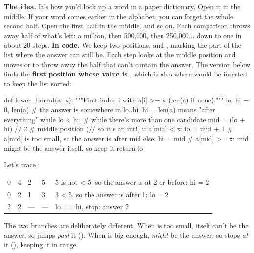 \documentclass[10pt,a4paper]{article}
\begin{document}
\textbf{The idea.} It’s how you’d look up a word in a paper dictionary. Open it in the middle. If your word comes earlier in the alphabet, you can forget the whole second half. Open the first half in the middle, and so on. Each comparison throws away half of what’s left: a million, then 500,000, then 250,000... down to one in about 20 steps.
\textbf{In code.} We keep two positions,  and , marking the part of the list where the answer can still be. Each step looks at the middle position  and moves  or  to throw away the half that can’t contain the answer. The version below finds the \textbf{first position whose value is }, which is also where  would be inserted to keep the list sorted:
\begin{pycode}
def lower_bound(a, x):
    """First index i with a[i] >= x (len(a) if none)."""
    lo, hi = 0, len(a)            # the answer is somewhere in lo..hi; hi = len(a) means "after everything"
    while lo < hi:                # while there's more than one candidate
        mid = (lo + hi) // 2      # middle position (// so it's an int!)
        if a[mid] < x:
            lo = mid + 1          # a[mid] is too small, so the answer is after mid
        else:
            hi = mid              # a[mid] >= x: mid might be the answer itself, so keep it
    return lo
\end{pycode}
Let’s trace :
\begin{datatable}{}{\small}
\begin{xltabular}{\linewidth}{@{}Y{0.43}Y{0.43}Y{0.43}Y{0.43}Y{3.28}@{}}
 &  &  &  &  \\ \hline
{} & 4 & 2 & 5 & 5 is not \textless{} 5, so the answer is at 2 or before: hi = 2 \\
0 & 2 & 1 & 3 & 3 \textless{} 5, so the answer is after 1: lo = 2 \\
2 & 2 & — & — & lo == hi, stop: answer 2 \\
\hline
\end{xltabular}
\end{datatable}
The two branches are deliberately different. When  is too small,  itself can’t be the answer, so  jumps \emph{past} it (). When  is big enough,  \emph{might} be the answer, so  stops \emph{at} it (), keeping it in range.
\end{document}
